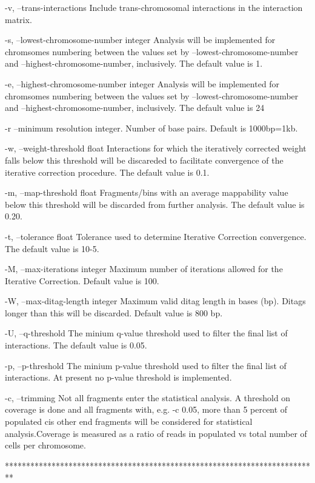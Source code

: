 \documentclass[10pt,a4paper]{article}
\begin{document}
        -v, --trans-interactions    Include trans-chromosomal interactions in the interaction matrix.

        -s, --lowest-chromosome-number integer    Analysis will be implemented for chromsomes numbering between the values set by --lowest-chromosome-number and --highest-chromosome-number, inclusively.  The default value is 1.

        -e, --highest-chromosome-number integer    Analysis will be implemented for chromsomes numbering between the values set by --lowest-chromosome-number and --highest-chromosome-number, inclusively.  The default value is 24 

        -r  --minimum resolution integer. Number of base pairs. Default is 1000bp=1kb.

        -w, --weight-threshold float    Interactions for which the iteratively corrected weight falls below this threshold will be discareded to facilitate convergence of the iterative correction procedure.  The default value is 0.1.

        -m, --map-threshold float    Fragments/bins with an average mappability value below this threshold will be discarded from further analysis. The default value is 0.20.

        -t, --tolerance float    Tolerance used to determine Iterative Correction convergence. The default value is 10-5.

        -M, --max-iterations integer    Maximum number of iterations allowed for the Iterative Correction. Default value is 100.

        -W, --max-ditag-length integer    Maximum valid ditag length in bases (bp).  Ditags longer than this will be discarded. Default value is 800 bp.

        -U, --q-threshold    The minium q-value threshold used to filter the final list of interactions.  The default value is 0.05.

        -p, --p-threshold    The minium p-value threshold used to filter the final list of interactions.  At present no p-value threshold is implemented.

        -c, --trimming  Not all fragments enter the statistical analysis. A threshold on coverage is done and all fragments with, e.g. -c 0.05, more than 5 percent of populated cis other end fragments will be considered for statistical analysis.Coverage is measured as a ratio of reads in populated vs total number of cells per chromosome.

**************************************************************************\\
\end{document}
